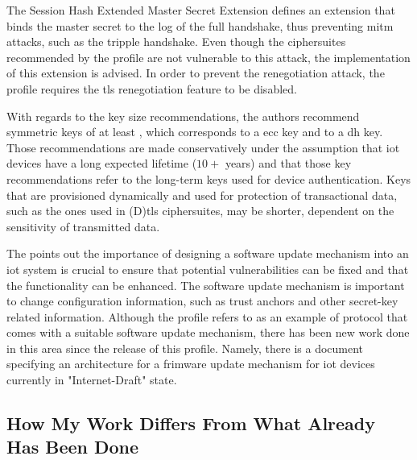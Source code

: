 \documentclass{llncs}
\begin{document}
The Session Hash Extended Master Secret Extension \cite{RFC7627} defines an extension
that binds the master secret to the log of the full handshake, thus preventing
\gls{mitm} attacks, such as the tripple handshake\cite{TripleHa89:online}. Even though the
ciphersuites recommended by the profile are not vulnerable to this attack, the
implementation of this extension is advised. In order to prevent the renegotiation
attack\cite{RFC5746}, the profile requires the \gls{tls} renegotiation feature
to be disabled.

With regards to the key size recommendations, the authors recommend symmetric keys
of at least , which corresponds to a  \gls{ecc}
key and to a  \gls{dh} key. Those recommendations are made
conservatively under the assumption that \gls{iot} devices have a long expected
lifetime ($10+$ years) and that those key recommendations refer to the long-term
keys used for device authentication. Keys that are provisioned dynamically
and used for protection of transactional data, such as the ones used in
(D)\gls{tls} ciphersuites, may be shorter, dependent on the sensitivity of
transmitted data.

The \cite{rfc7925} points out the importance of designing a software
update mechanism into an \gls{iot} system is crucial to ensure that potential vulnerabilities
can be fixed and that the functionality can be enhanced. The software update mechanism
is important to change configuration information, such as trust anchors and
other secret-key related information. Although the profile refers to \cite{OpenMobi29:online}
as an example of protocol that comes with a suitable software update mechanism,
there has been new work done in this area since the release of this profile.
Namely, there is a document specifying an architecture for a frimware update
mechanism for \gls{iot} devices\cite{I-D.draft-moran-suit-architecture} currently in "Internet-Draft" state.

\subsection{How My Work Differs From What Already Has Been Done}
\end{document}
